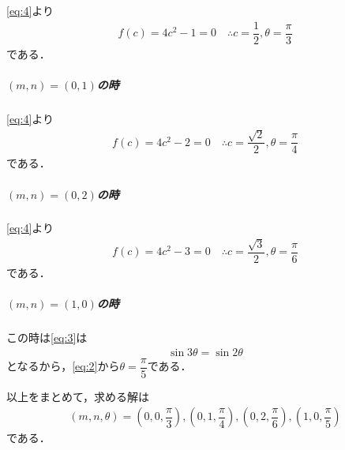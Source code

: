 \documentclass[../../main.tex]{subfiles}
\begin{document}
\cref{eq:4}より
\begin{align}
  f(c) = 4c^2 - 1 = 0
  \quad \therefore
  c = \dfrac{1}{2}, \theta = \dfrac{\pi}{3}
\end{align}
である．

\subparagraph{$(m,n)=(0,1)$の時}

\cref{eq:4}より
\begin{align}
  f(c) = 4c^2-2 = 0
  \quad \therefore
  c = \dfrac{\sqrt{2}}{2}, \theta = \dfrac{\pi}{4}
\end{align}
である．

\subparagraph{$(m,n)=(0,2)$の時}

\cref{eq:4}より
\begin{align}
  f(c) = 4c^2 - 3 = 0
  \quad \therefore
  c = \dfrac{\sqrt{3}}{2}, \theta = \dfrac{\pi}{6}
\end{align}
である．

\subparagraph{$(m,n)=(1,0)$の時}

この時は\cref{eq:3}は
\begin{align}
  \sin 3\theta = \sin 2\theta
\end{align}
となるから，\cref{eq:2}から$\theta = \dfrac{\pi}{5}$である．
\casesend

以上をまとめて，求める解は
\begin{align}
  (m, n, \theta) = \left(0, 0, \dfrac{\pi}{3}\right), \left(0, 1, \dfrac{\pi}{4}\right), \left(0, 2, \dfrac{\pi}{6}\right), \left(1, 0, \dfrac{\pi}{5}\right)
\end{align}
である．
\end{document}
